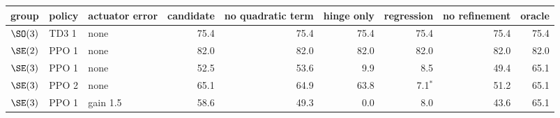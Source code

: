 \begin{tabular}{@{}lllrrrrrr@{}}
\toprule
group & policy & actuator error & candidate & no quadratic term & hinge only & regression & no refinement & oracle \\
\midrule
$\SO(3)$ & TD3 1 & none & 75.4 & 75.4 & 75.4 & 75.4 & 75.4 & 75.4 \\
$\SE(2)$ & PPO 1 & none & 82.0 & 82.0 & 82.0 & 82.0 & 82.0 & 82.0 \\
$\SE(3)$ & PPO 1 & none & 52.5 & 53.6 & 9.9 & 8.5 & 49.4 & 65.1 \\
$\SE(3)$ & PPO 2 & none & 65.1 & 64.9 & 63.8 & 7.1$^{*}$ & 51.2 & 65.1 \\
$\SE(3)$ & PPO 1 & gain 1.5 & 58.6 & 49.3 & 0.0 & 8.0 & 43.6 & 65.1 \\
\bottomrule
\end{tabular}
